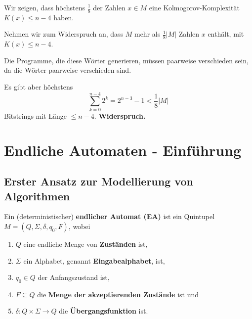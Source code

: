 \documentclass[a4paper, 11pt]{article}
\begin{document}
        Wir zeigen, dass höchstens $\frac{1}{8}$ der Zahlen $x \in M$ eine Kolmogorov-Komplexität $K(x) \leq n-4$ haben. 
    
        Nehmen wir zum Widerspruch an, dass $M$ mehr als $\frac{1}{8}|M|$ Zahlen $x$ enthält, mit $K(x) \leq n-4$. 
    
        Die Programme, die diese Wörter generieren, müssen paarweise verschieden sein, da die Wörter paarweise verschieden sind.
    
        Es gibt aber höchstens 
        $$\sum_{k=0}^{n-4}2^k = 2^{n-3} - 1 < \frac{1}{8}|M|$$
        Bitstrings mit Länge $\leq n-4$. \textbf{Widerspruch.}
    


        \vspace*{1cm}
    


    \section{Endliche Automaten - Einführung}

	\subsection{Erster Ansatz zur Modellierung von Algorithmen}
	\begin{mainbox}{}
		Ein (deterministischer) \textbf{endlicher Automat (EA)} ist ein Quintupel $M = (Q, \Sigma, \delta, q_0, F)$, wobei
		\begin{enumerate}[label=(\roman*)]
			\item $Q$ eine endliche Menge von \textbf{Zuständen} ist,
			\item $\Sigma$ ein Alphabet, genannt \textbf{Eingabealphabet}, ist,
			\item $q_0 \in Q$ der Anfangszustand ist,
			\item $F \subseteq Q$ die \textbf{Menge der akzeptierenden Zustände} ist und
			\item $\delta: Q \times \Sigma \to Q$ die \textbf{Übergangsfunktion} ist.
		\end{enumerate}
	\end{mainbox}
\end{document}
